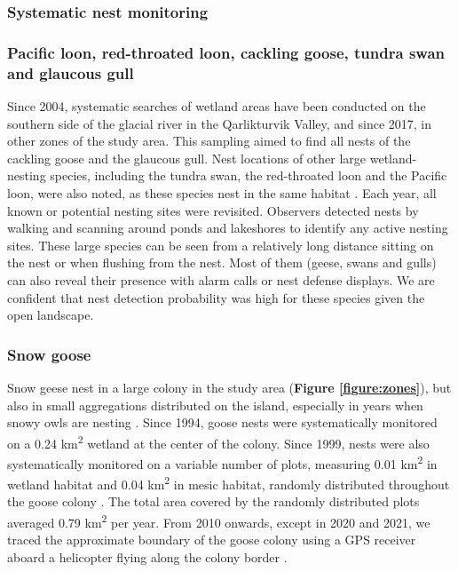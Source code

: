 \documentclass[a4paper,twoside,10pt]{article}
\begin{document}

\newpage


\subsubsection{Systematic nest monitoring}
\subsubsection*{Pacific loon, red-throated loon, cackling goose, tundra swan and glaucous gull}
Since 2004, systematic searches of wetland areas have been conducted on the southern side of the glacial river in the Qarlikturvik Valley, and since 2017, in other zones of the study area. This sampling aimed to find all nests of the cackling goose and the glaucous gull. Nest locations of other large wetland-nesting species, including the tundra swan, the red-throated loon and the Pacific loon, were also noted, as these species nest in the same habitat \citep{duchesne2021,gauthier2024a}. Each year, all known or potential nesting sites were revisited. Observers detected nests by walking and scanning around ponds and lakeshores to identify any active nesting sites. These large species can be seen from a relatively long distance sitting on the nest or when flushing from the nest. Most of them (geese, swans and gulls) can also reveal their presence with alarm calls or nest defense displays. We are confident that nest detection probability was high for these species given the open landscape.

\subsubsection*{Snow goose}
Snow geese nest in a large colony in the study area (\textbf{Figure \ref{figure:zones}}), but also in small aggregations distributed on the island, especially in years when snowy owls are nesting \citep{lepage1996,reed2002}. Since 1994, goose nests were systematically monitored on a 0.24 km\textsuperscript{2} wetland at the center of the colony. Since 1999, nests were also systematically monitored on a variable number of plots, measuring 0.01 km\textsuperscript{2} in wetland habitat and 0.04 km\textsuperscript{2} in mesic habitat, randomly distributed throughout the goose colony \citep{gauthier2020goose}. The total area covered by the randomly distributed plots averaged 0.79  km\textsuperscript{2} per year. From 2010 onwards, except in 2020 and 2021, we traced the approximate boundary of the goose colony using a GPS receiver aboard a helicopter flying along the colony border \citep{duchesne2021}.
\end{document}
